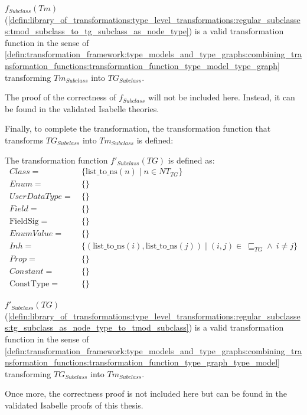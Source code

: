 \begin{thm}
\label{defin:library_of_transformations:type_level_transformations:regular_subclasses:tmod_subclass_to_tg_subclass_as_node_type_func}
$f_{Subclass}(Tm)$ (\cref{defin:library_of_transformations:type_level_transformations:regular_subclasses:tmod_subclass_to_tg_subclass_as_node_type}) is a valid transformation function in the sense of \cref{defin:transformation_framework:type_models_and_type_graphs:combining_transformation_functions:transformation_function_type_model_type_graph} transforming $Tm_{Subclass}$ into $TG_{Subclass}$.
\end{thm}

The proof of the correctness of $f_{Subclass}$ will not be included here. Instead, it can be found in the validated Isabelle theories.

Finally, to complete the transformation, the transformation function that transforms $TG_{Subclass}$ into $Tm_{Subclass}$ is defined:

\begin{defin}
\label{defin:library_of_transformations:type_level_transformations:regular_subclasses:tg_subclass_as_node_type_to_tmod_subclass}
The transformation function $f'_{Subclass}(TG)$ is defined as:
\begin{align*}
Class =\ &\{\mathrm{list\_\!to\_\!ns}(n) \mid n \in NT_{TG}\} \\
Enum =\ &\{\} \\
UserDataType =\ &\{\} \\
Field =\ &\{\} \\
\mathrm{FieldSig} =\ &\{\} \\
EnumValue =\ &\{\} \\
Inh =\ &\{(\mathrm{list\_\!to\_\!ns}(i), \mathrm{list\_\!to\_\!ns}(j)) \mid (i, j) \in\ \sqsubseteq_{TG} \land\ i \neq j \} \\
Prop =\ &\{\} \\
Constant =\ &\{\} \\
\mathrm{ConstType} =\ &\{\}
\end{align*}
\end{defin}

\begin{thm}
\label{defin:library_of_transformations:type_level_transformations:regular_subclasses:tg_subclass_as_node_type_to_tmod_subclass_func}
$f'_{Subclass}(TG)$ (\cref{defin:library_of_transformations:type_level_transformations:regular_subclasses:tg_subclass_as_node_type_to_tmod_subclass}) is a valid transformation function in the sense of \cref{defin:transformation_framework:type_models_and_type_graphs:combining_transformation_functions:transformation_function_type_graph_type_model} transforming $TG_{Subclass}$ into $Tm_{Subclass}$.
\end{thm}

Once more, the correctness proof is not included here but can be found in the validated Isabelle proofs of this thesis.